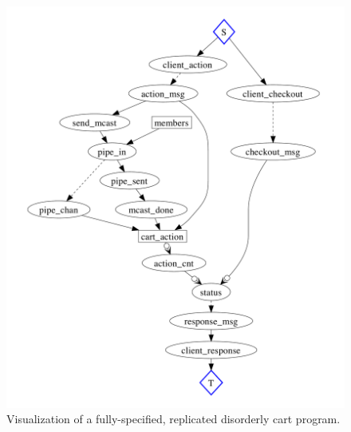 \begin{figure}[t]
\centering
\includegraphics[width=1\linewidth]{fig/disorderly_complete.pdf}
\vspace{-10pt}
\caption{Visualization of a fully-specified, replicated disorderly cart program.}
\label{fig:pdg-disorderly-analysis}
\vspace{-2pt}
\end{figure}


